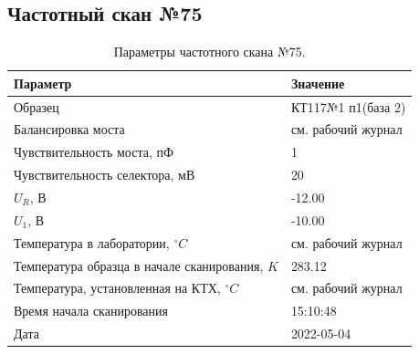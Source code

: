 \subsection{Частотный скан №75}
\begin{table}[!ht]
    \centering
    \caption{Параметры частотного скана №75.}
    \begin{tabular}{|l|l|}
        \hline
        Параметр                                       & Значение                  \\ \hline
        Образец                                        & КТ117№1 п1(база 2)        \\ \hline
        Балансировка моста                             & см. рабочий журнал        \\ \hline
        Чувствительность моста, пФ                     & 1                         \\ \hline
        Чувствительность селектора, мВ                 & 20                        \\ \hline
        $U_R$, В                                       & -12.00                    \\ \hline
        $U_1$, В                                       & -10.00                    \\ \hline
        Температура в лаборатории, $^\circ C$          & см. рабочий журнал        \\ \hline
        Температура образца в начале сканирования, $K$ & 283.12                    \\ \hline
        Температура, установленная на КТХ, $^\circ C$  & см. рабочий журнал        \\ \hline
        Время начала сканирования                      & 15:10:48                  \\ \hline
        Дата                                           & 2022-05-04                \\ \hline
    \end{tabular}
    \label{table:frequency_scan_75}
\end{table}

